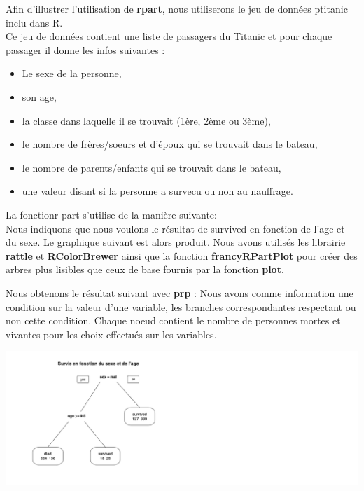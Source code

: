\documentclass[compress]{beamer}
\begin{document}
\begin{frame}
Afin d'illustrer l'utilisation de \textbf{rpart}, nous utiliserons le jeu de données \textrm{ptitanic} inclu dans R.\\
Ce jeu de données contient une liste de passagers du Titanic et pour chaque passager il donne les infos suivantes :\\
\begin{itemize}
 \item Le sexe de la personne,
 \item son age,
 \item la classe dans laquelle il se trouvait (1ère, 2ème ou 3ème),
 \item le nombre de frères/soeurs et d'époux qui se trouvait dans le bateau,
 \item le nombre de parents/enfants qui se trouvait dans le bateau,
 \item une valeur disant si la personne a survecu ou non au nauffrage.
\end{itemize}
\end{frame}
\begin{frame}
La fonctionr part s'utilise de la manière suivante: \\

Nous indiquons que nous voulons le résultat de \textrm{survived} en fonction de l'age et du sexe.
Le graphique suivant est alors produit. Nous avons utilisés les librairie \textbf{rattle} et \textbf{RColorBrewer} ainsi que la fonction \textbf{francyRPartPlot} pour 
créer des arbres plus lisibles que ceux de base fournis par la fonction \textbf{plot}.
\end{frame}
\begin{frame}
Nous obtenons le résultat suivant avec \textbf{prp} :
Nous avons comme information une condition sur la valeur d'une variable, les branches correspondantes respectant ou non cette condition.
Chaque noeud contient le nombre de personnes mortes et vivantes pour les choix effectués sur les variables.

      \begin{center}
            \includegraphics[width=\textwidth,height=0.8\textheight,keepaspectratio]{survie-sexe-age-base.png}
        \end{center}
\end{frame}
\end{document}
